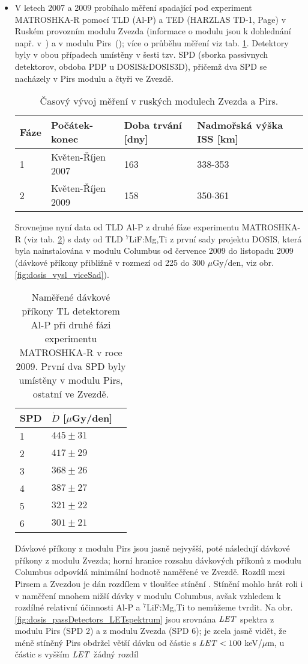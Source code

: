 \begin{itemize}
\item V letech 2007 a 2009 probíhalo měření spadající pod experiment MATROSHKA-R pomocí TLD (Al-P) a TED (HARZLAS TD-1, Page) v Ruském provozním modulu Zvezda (informace o modulu jsou k dohlednání např. v~\cite{serviceModule}) a v modulu Pirs~(\cite{piers1}); více o průběhu měření viz tab. \ref{tab:dosis_passDetectors_timeline}. Detektory byly v obou případech umístěny v šesti tzv. SPD (sborka passivnych detektorov, obdoba PDP u DOSIS\&DOSIS3D), přičemž dva SPD se nacházely v Pirs modulu a čtyři ve Zvezdě. 
\begin{table}[h]
  \centering
  \caption{Časový vývoj měření v ruských modulech Zvezda a Pirs. \cite{passDetectors}}
  \label{tab:dosis_passDetectors_timeline}
  \begin{tabular}{llll}
	\toprule
	Fáze&Počátek-konec&Doba trvání [dny]&Nadmořská výška ISS [km]\\
	\midrule
	1&Květen-Říjen 2007&163&338-353\\
	2&Květen-Říjen 2009&158&350-361\\
	\bottomrule
  \end{tabular}
\end{table}
Srovnejme nyní data od TLD Al-P z druhé fáze experimentu MATROSHKA-R (viz tab. \ref{tab:dosis_passDetectors_vysledky}) s daty od TLD $^7$LiF:Mg,Ti z první sady projektu DOSIS, která byla nainstalována v modulu Columbus od července 2009 do listopadu 2009 (dávkové příkony přibližně v rozmezí od 225 do 300 $\mu$Gy/den, viz obr. \ref{fig:dosis_vysl_viceSad}). 
\begin{table}[h]
  \centering
  \caption{Naměřené dávkové příkony TL detektorem Al-P při druhé fázi experimentu MATROSHKA-R v roce 2009. První dva SPD byly umístěny v modulu Pirs, ostatní ve Zvezdě. \cite{passDetectors}}
  \label{tab:dosis_passDetectors_vysledky}
  \begin{tabular}{lll}
	\toprule
	SPD&$\dot{D}$ [$\mu$Gy/den]\\
	\midrule
	1&$445\pm31$\\
	2&$417\pm29$\\
	3&$368\pm26$\\
	4&$387\pm27$\\
	5&$321\pm22$\\
	6&$301\pm21$\\
	\bottomrule
  \end{tabular}
\end{table}
Dávkové příkony z modulu Pirs jsou jasně nejvyšší, poté následují dávkové příkony z modulu Zvezda; horní hranice rozsahu dávkových příkonů z modulu Columbus odpovídá minimální hodnotě naměřené ve Zvezdě. Rozdíl mezi Pirsem a Zvezdou je dán rozdílem v tloušťce stínění \cite{passDetectors}. Stínění mohlo hrát roli i v naměření mnohem nižší dávky v modulu Columbus, avšak vzhledem k rozdílné relativní účinnosti Al-P a $^7$LiF:Mg,Ti to nemůžeme tvrdit. Na obr. \ref{fig:dosis_passDetectors_LETspektrum} jsou srovnána $\mathit{LET}$ spektra z modulu Pirs (SPD 2) a z modulu Zvezda (SPD 6); je zcela jasně vidět, že méně stíněný Pirs obdržel větší dávku od částic s $\mathit{LET}<100$ keV/$\mu$m, u částic s vyšším $\mathit{LET}$ žádný rozdíl

\end{itemize}
